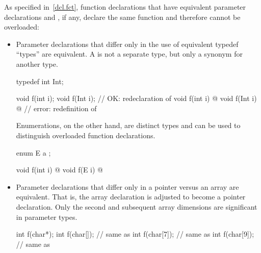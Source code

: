\pnum
{}%
%
\begin{note}
As specified in~\ref{dcl.fct},
function declarations that have equivalent parameter declarations
and , if any,
declare
the same function and therefore cannot
be overloaded:

\begin{itemize}
\item
{}%
Parameter declarations that differ only in the use of equivalent typedef
``types'' are equivalent.
A
is not a separate type, but only a synonym for another type.
\begin{example}
\begin{codeblock}
typedef int Int;

void f(int i);
void f(Int i);                  // OK: redeclaration of 
void f(int i) { @\commentellip@ }
void f(Int i) { @\commentellip@ }     // error: redefinition of 
\end{codeblock}
\end{example}

%
Enumerations, on the other hand, are distinct types and can be used to
distinguish
overloaded function declarations.
\begin{example}
\begin{codeblock}
enum E { a };

void f(int i) { @\commentellip@ }
void f(E i)   { @\commentellip@ }
\end{codeblock}
\end{example}

\item
{}%
%
Parameter declarations that differ only in a pointer
\tcode{*}
versus an array
\tcode{[]}
are equivalent.
That is, the array declaration is adjusted to become a pointer
declaration.
Only the second and subsequent array dimensions are significant in
parameter types.
\begin{example}

\begin{codeblock}
int f(char*);
int f(char[]);                  // same as 
int f(char[7]);                 // same as 
int f(char[9]);                 // same as 


\end{codeblock}
\end{example}
\end{itemize}
\end{note}
